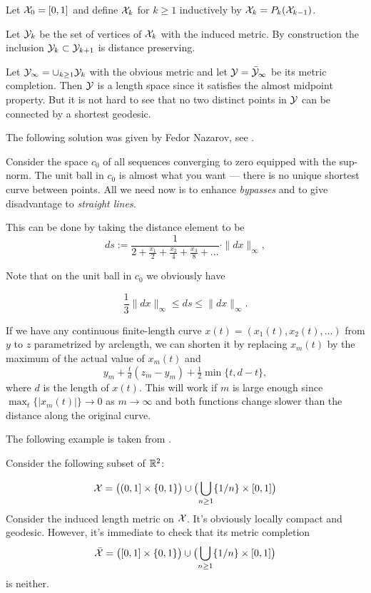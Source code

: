 Let $\mathcal{X}_0=[0,1]$ and define $\mathcal{X}_k$ for $k\ge 1$ inductively by $\mathcal{X}_k=P_k(\mathcal{X}_{k-1})$.

Let $\mathcal{Y}_k$ be the set of vertices of $\mathcal{X}_k$ with the induced metric. By construction the inclusion $\spc{Y}_k\subset \spc{Y}_{k+1}$ is distance preserving.

Let $\spc{Y}_\infty=\cup_{k\ge 1}\spc{Y}_k$ with the obvious metric and let $\mathcal{Y}=\bar {\mathcal{Y}}_\infty$ be its metric completion. Then $\mathcal{Y}$ is a length space since it satisfies the almost midpoint property. But it is not hard to see that no two distinct points in $\mathcal{Y}$ can be connected by a shortest geodesic. \qeds


The following solution was given by Fedor Nazarov, see \cite{nazarov}.

Consider the space $c_0$ of all sequences converging to zero equipped with the sup-norm.
The unit ball in $c_0$ is almost what you want --- there is no unique shortest curve between points. 
All we need now is to enhance {}\emph{bypasses} and to give disadvantage to \emph{straight lines}. 

This can be done by taking the distance element to be 
\[ds:=\frac1{2+\frac{x_1}2+\frac{x_2}4+\frac{x_3}8+\dots}\cdot\|dx\|_\infty,\] 

Note that on the unit ball in $c_0$ we obviously have 

\[
 \frac{1}{3}\|dx\|_\infty \le ds\le \|dx\|_\infty.
\]


If we have any continuous finite-length curve $x(t)=(x_1(t),x_2(t),\dots)$ from $y$ to $z$ parametrized by arclength, we can shorten it by replacing $x_m(t)$ by the maximum of the actual value of $x_m(t)$ and 
\[y_m+\tfrac td(z_m-y_m)+\tfrac 12 \min\{t,d-t\},\] 
where $d$ is the length of $x(t)$. 
This will work if $m$ is large enough since $\max_t\{|x_m(t)|\}\to 0$ as $m\to\infty$ and both functions change slower than the distance along the original curve.\qeds

The following example is taken from \cite{BH}.

\medskip

Consider the following subset of $\mathbb{R}^2$:

\[
\spc{X}
=
\bigl((0,1]\times\{0,1\}\bigr)
\cup
\bigl(\bigcup_{n\ge 1}\{1/n\}\times[0,1]\bigr)
\]
Consider the induced length metric on $\mathcal{X}$. It's obviously locally compact and geodesic.
However, it's immediate to check that its metric completion \[\bar{\spc{X}}
=
\bigl([0,1]\times\{0,1\}\bigr)
\cup
\bigl(\bigcup_{n\ge 1}\{1/n\}\times[0,1]\bigr)\] 
is neither. \qeds 

